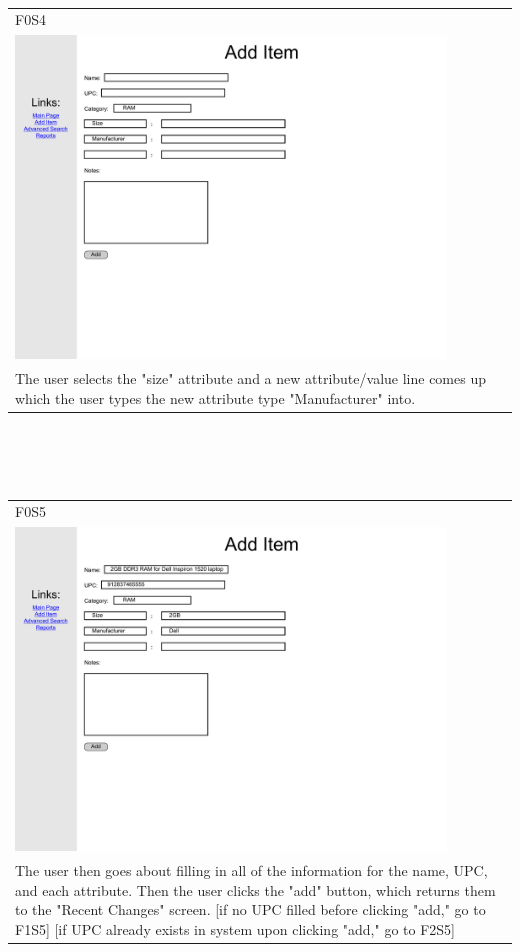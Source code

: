 \documentclass{article}
\begin{document}
~\\
\begin{tabular}{ p{4.5in} }
F0S4\\
\includegraphics[keepaspectratio, width=4.5in]{addItemF0S4.pdf} \\
The user selects the "size" attribute and a new attribute/value line comes up which the user types the new attribute type "Manufacturer" into.
\end{tabular}\\
~\\
~\\
\begin{tabular}{ p{4.5in} }
F0S5\\
\includegraphics[keepaspectratio, width=4.5in]{addItemF0S5.pdf}\\
The user then goes about filling in all of the information for the name, UPC, and each attribute. Then the user clicks the "add" button, which returns them to the "Recent Changes" screen. [if no UPC filled before clicking "add," go to F1S5] [if UPC already exists in system upon clicking "add," go to F2S5] 
\end{tabular}\\
\end{document}

